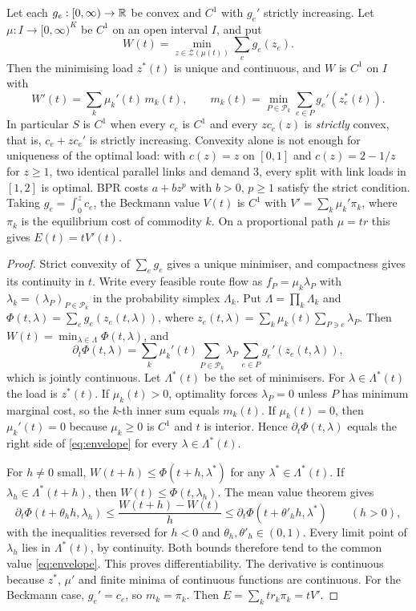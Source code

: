 \begin{proposition}\label{prop:Sregular}
Let each $g_e:[0,\infty)\to\mathbb R$ be convex and $C^1$ with $g_e'$ strictly increasing. Let $\mu:I\to[0,\infty)^K$ be $C^1$ on an open interval $I$, and put
\[
 W(t)=\min_{z\in\mathcal Z(\mu(t))}\sum_eg_e(z_e).
\]
Then the minimising load $z^*(t)$ is unique and continuous, and $W$ is $C^1$ on $I$ with
\begin{equation}\label{eq:envelope}
 W'(t)=\sum_k\mu_k'(t)\,m_k(t),\qquad m_k(t)=\min_{P\in\mathcal P_k}\sum_{e\in P}g_e'(z^*_e(t)).
\end{equation}
In particular $S$ is $C^1$ when every $c_e$ is $C^1$ and every $zc_e(z)$ is \emph{strictly} convex, that is, $c_e+zc_e'$ is strictly increasing. Convexity alone is not enough for uniqueness of the optimal load: with $c(z)=z$ on $[0,1]$ and $c(z)=2-1/z$ for $z\ge1$, two identical parallel links and demand $3$, every split with link loads in $[1,2]$ is optimal. BPR costs $a+bz^p$ with $b>0$, $p\ge1$ satisfy the strict condition. Taking $g_e=\int_0^zc_e$, the Beckmann value $V(t)$ is $C^1$ with $V'=\sum_k\mu_k'\pi_k$, where $\pi_k$ is the equilibrium cost of commodity $k$. On a proportional path $\mu=tr$ this gives $E(t)=tV'(t)$.
\end{proposition}
\begin{proof}
Strict convexity of $\sum_eg_e$ gives a unique minimiser, and compactness gives its continuity in $t$. Write every feasible route flow as $f_P=\mu_k\lambda_P$ with $\lambda_k=(\lambda_P)_{P\in\mathcal P_k}$ in the probability simplex $\Lambda_k$. Put $\Lambda=\prod_k\Lambda_k$ and $\Phi(t,\lambda)=\sum_eg_e(z_e(t,\lambda))$, where $z_e(t,\lambda)=\sum_k\mu_k(t)\sum_{P\ni e}\lambda_P$. Then $W(t)=\min_{\lambda\in\Lambda}\Phi(t,\lambda)$, and
\[
 \partial_t\Phi(t,\lambda)=\sum_k\mu_k'(t)\sum_{P\in\mathcal P_k}\lambda_P\,\sum_{e\in P}g_e'(z_e(t,\lambda)),
\]
which is jointly continuous. Let $\Lambda^*(t)$ be the set of minimisers. For $\lambda\in\Lambda^*(t)$ the load is $z^*(t)$. If $\mu_k(t)>0$, optimality forces $\lambda_P=0$ unless $P$ has minimum marginal cost, so the $k$-th inner sum equals $m_k(t)$. If $\mu_k(t)=0$, then $\mu_k'(t)=0$ because $\mu_k\ge0$ is $C^1$ and $t$ is interior. Hence $\partial_t\Phi(t,\lambda)$ equals the right side of \eqref{eq:envelope} for every $\lambda\in\Lambda^*(t)$.

For $h\ne0$ small, $W(t+h)\le\Phi(t+h,\lambda^*)$ for any $\lambda^*\in\Lambda^*(t)$. If $\lambda_h\in\Lambda^*(t+h)$, then $W(t)\le\Phi(t,\lambda_h)$. The mean value theorem gives
\[
 \partial_t\Phi(t+\theta_hh,\lambda_h)\le\frac{W(t+h)-W(t)}{h}\le\partial_t\Phi(t+\theta'_hh,\lambda^*)\qquad(h>0),
\]
with the inequalities reversed for $h<0$ and $\theta_h,\theta'_h\in(0,1)$. Every limit point of $\lambda_h$ lies in $\Lambda^*(t)$, by continuity. Both bounds therefore tend to the common value \eqref{eq:envelope}. This proves differentiability. The derivative is continuous because $z^*$, $\mu'$ and finite minima of continuous functions are continuous. For the Beckmann case, $g_e'=c_e$, so $m_k=\pi_k$. Then $E=\sum_kt r_k\pi_k=tV'$.
\end{proof}


